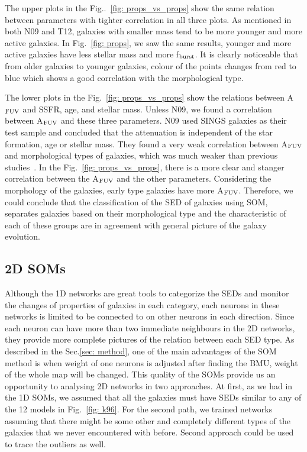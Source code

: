         The upper plots in the Fig..~\ref{fig: props_vs_props} show the same relation between parameters with tighter correlation in all three plots.
        As mentioned in both N09 and T12, galaxies with smaller mass tend to be more younger and more active galaxies.
        In Fig.~\ref{fig: props}, we saw the same results, younger and more active galaxies have less stellar mass and more f$_{\rm {burst}}$.
        It is clearly noticeable that from older galaxies to younger galaxies, colour of the points changes from red to blue  which shows a good correlation with the morphological type.
        
        The lower plots in the Fig.~\ref{fig: props_vs_props} show the relations between A$_{\rm {FUV}}$ and SSFR, age, and stellar mass.
        Unless N09, we found a correlation between A$_{\rm {FUV}}$ and these three parameters.
        N09 used SINGS galaxies as their test sample and concluded that the attenuation is independent of the star formation, age or stellar mass.
        They found a very weak correlation between A$_{\rm {FUV}}$ and morphological types of galaxies, which was much weaker than previous studies~\citep[e.g.][]{Dale07}.
        In the Fig.~\ref{fig: props_vs_props}, there is a more clear and stanger correlation between the A$_{\rm {FUV}}$ and the other parameters.
        Considering the morphology of the galaxies, early type galaxies have more A$_{\rm {FUV}}$.
        Therefore, we could conclude that the classification of the SED of galaxies using SOM, separates galaxies based on their morphological type and the characteristic of each of these groups are in agreement with general picture of the galaxy evolution.%

    \subsection{2D SOMs}
    \label{sec: 2D}
    Although the 1D networks are great tools to categorize the SEDs and monitor the changes of properties of galaxies in each category, each neurons in these networks is limited to be connected to on other neurons in each direction.
    Since each neuron can have more than two immediate neighbours in the 2D networks, they provide more complete pictures of the relation between each SED type.
    As described in the Sec.\ref{sec: method}, one of the main advantages of the SOM method is when weight of one neurons is adjusted after finding the BMU, weight of the whole map will be changed.
    This quality of the SOMs provide us an opportunity to analysing 2D networks in two approaches. 
    At first, as we had in the 1D SOMs, we assumed that all the galaxies must have SEDs similar to any of the 12 models in Fig.~\ref{fig: k96}.
    For the second path, we trained networks assuming that there might be some other and completely different types of the galaxies that we never encountered with before.
    Second approach could be used to trace the outliers as well.
    
